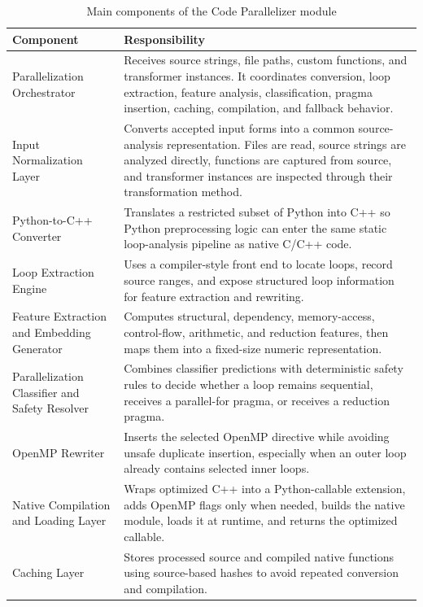 \begin{table}[H]
\centering
\fontsize{8.8}{10.5}\selectfont
\setlength{\tabcolsep}{5pt}
\renewcommand{\arraystretch}{0.88}
\caption{Main components of the Code Parallelizer module}
\begin{tabular}{p{}p{}}
\toprule
Component & Responsibility \\
\midrule
Parallelization Orchestrator & Receives source strings, file paths, custom functions, and transformer instances. It coordinates conversion, loop extraction, feature analysis, classification, pragma insertion, caching, compilation, and fallback behavior. \\
Input Normalization Layer & Converts accepted input forms into a common source-analysis representation. Files are read, source strings are analyzed directly, functions are captured from source, and transformer instances are inspected through their transformation method. \\
Python-to-C++ Converter & Translates a restricted subset of Python into C++ so Python preprocessing logic can enter the same static loop-analysis pipeline as native C/C++ code. \\
Loop Extraction Engine & Uses a compiler-style front end to locate loops, record source ranges, and expose structured loop information for feature extraction and rewriting. \\
Feature Extraction and Embedding Generator & Computes structural, dependency, memory-access, control-flow, arithmetic, and reduction features, then maps them into a fixed-size numeric representation. \\
Parallelization Classifier and Safety Resolver & Combines classifier predictions with deterministic safety rules to decide whether a loop remains sequential, receives a parallel-for pragma, or receives a reduction pragma. \\
OpenMP Rewriter & Inserts the selected OpenMP directive while avoiding unsafe duplicate insertion, especially when an outer loop already contains selected inner loops. \\
Native Compilation and Loading Layer & Wraps optimized C++ into a Python-callable extension, adds OpenMP flags only when needed, builds the native module, loads it at runtime, and returns the optimized callable. \\
Caching Layer & Stores processed source and compiled native functions using source-based hashes to avoid repeated conversion and compilation. \\
\bottomrule
\end{tabular}
\end{table}

